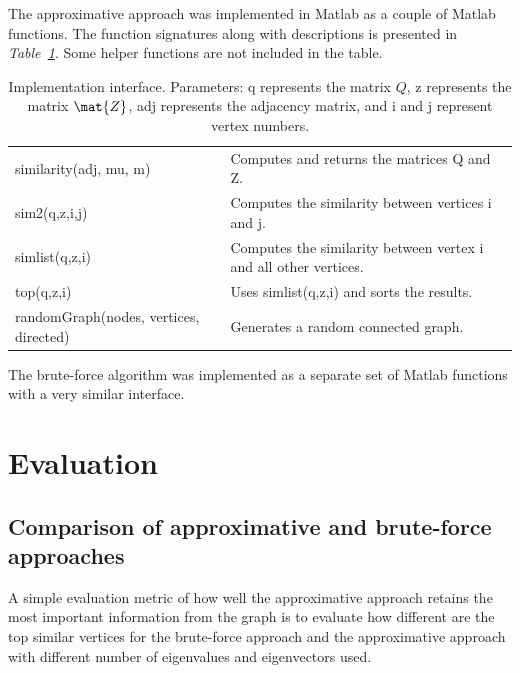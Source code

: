 \documentclass[12pt]{report}
\begin{document}
The approximative approach was implemented in Matlab as a couple of Matlab functions.
The function signatures along with descriptions is presented in \emph{Table~\ref{tbl:interface}}.
Some helper functions are not included in the table.
%
\begin{table}[!ht]\footnotesize
   \centering
   \begin{tabular}{ll}
   similarity(adj, mu, m) & Computes and returns the matrices Q and Z. \\
   sim2(q,z,i,j) & Computes the similarity between vertices i and j. \\
   simlist(q,z,i) & Computes the similarity between vertex i and all other vertices. \\
   top(q,z,i) & Uses simlist(q,z,i) and sorts the results. \\
   randomGraph(nodes, vertices, directed) & Generates a random connected graph.
   \end{tabular}
   \caption{Implementation interface. Parameters: q represents the matrix $Q$, z represents the matrix $\mat{Z}$, adj represents the adjacency matrix, and i and j represent vertex numbers.}
   \label{tbl:interface}
\end{table}


The brute-force algorithm was implemented as a separate set of Matlab functions
with a very similar interface.


%
%
\section{Evaluation}
\subsection{Comparison of approximative and brute-force approaches}
%
A simple evaluation metric of how well the approximative approach retains the
most important information from the graph is to evaluate how different are the
top similar vertices for the brute-force approach and the approximative approach
with different number of eigenvalues and eigenvectors used.
\end{document}
